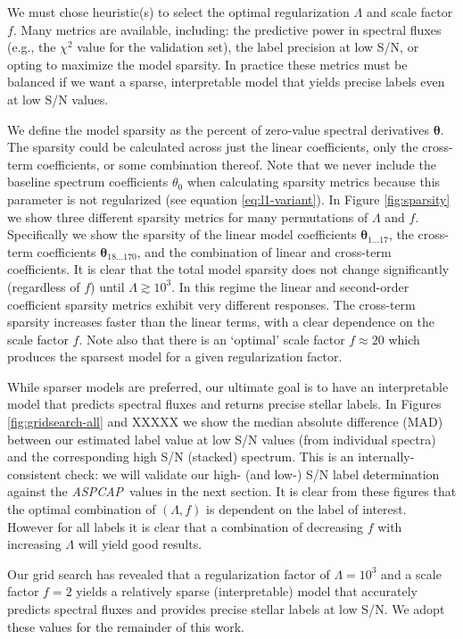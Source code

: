 \documentclass[12pt,preprint]{aastex}
\newcommand{\project}[1]{\textsl{#1}}
\newcommand{\acronym}[1]{{\small{#1}}}
\newcommand{\aspcap}{\project{\acronym{ASPCAP}}}
\newcommand{\Dvector}[1]{\boldsymbol{#1}}
\newcommand{\vectheta}{\Dvector{\theta}}
\begin{document}
We must chose heuristic(s) to select the optimal regularization $\Lambda$ and
scale factor $f$.  Many metrics are available, including: the predictive power
in spectral fluxes (e.g., the $\chi^2$ value for the validation set), the 
label precision at low S/N, or opting to maximize the model sparsity.  In practice these metrics must be
balanced if we want a sparse, interpretable model that yields precise labels
even at low S/N values.


We define the model sparsity as the percent of zero-value spectral derivatives $\vectheta$.
The sparsity could be calculated across just the linear coefficients, only
the cross-term coefficients, or some combination thereof.  Note that we never
include the baseline spectrum coefficients $\theta_0$ when calculating 
sparsity metrics because this parameter is not regularized (see equation 
\ref{eq:l1-variant}).  In Figure \ref{fig:sparsity} we show three different
sparsity metrics for many permutations of $\Lambda$ and $f$.  Specifically we
show the sparsity of the linear model coefficients $\vectheta_{1...17}$, the 
cross-term coefficients $\vectheta_{18...170}$, and the combination of linear
and cross-term coefficients.  It is clear that the total model sparsity does
not change significantly (regardless of $f$) until $\Lambda \gtrsim 10^3$.  
In this regime
the linear and second-order coefficient sparsity metrics exhibit very
different responses.  The cross-term sparsity increases faster than the
linear terms, with a clear dependence on the scale factor $f$.  Note also
that there is an `optimal' scale factor $f \approx 20$ which produces the 
sparsest model for a given regularization factor.


While sparser models are preferred, our ultimate goal is to have an
interpretable  model that predicts spectral fluxes and returns precise
stellar labels.  In Figures \ref{fig:gridsearch-all} and XXXXX we show the
median absolute difference (MAD) between our estimated label value at low 
S/N values (from individual spectra) and the corresponding high S/N (stacked)
spectrum.  This is an internally-consistent check: we will validate our high-
(and low-) S/N label determination against the \aspcap\ values in the next
section.  It is clear from these figures that the optimal combination of 
$(\Lambda, f)$ is dependent on the label of interest.  However for all 
labels it is clear that a combination of decreasing $f$ with increasing
$\Lambda$ will yield good results.  


Our grid search has revealed that a regularization factor of $\Lambda = 10^3$ and
a scale factor $f = 2$ yields a relatively sparse (interpretable) model that
accurately predicts spectral fluxes and provides precise stellar labels at low S/N. 
 We adopt these values for the remainder of this work.
\end{document}
